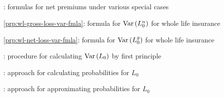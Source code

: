 \subsection*{}
\item {}: formulas for net premiums under various special cases
\item \cref{prp:wl-gross-loss-var-fmla}: formula for \(\operatorname{Var}\qty(L_0^n)\) for whole life insurance
\item \cref{prp:wl-net-loss-var-fmla}: formula for \(\operatorname{Var}\qty(L_0^g)\) for whole life insurance
\item {}: procedure for calculating \(\operatorname{Var}\qty(L_0)\) by first principle
\item {}: approach for calculating probabilities for \(L_0\)
\item {}: approach for approximating probabilities for \(L_0\)

